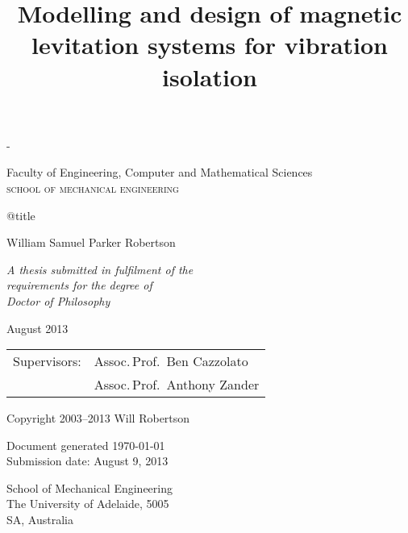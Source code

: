 \documentclass[11pt,a4paper]{memoir}
\title{
Modelling and design of magnetic levitation systems for vibration isolation
}
\begin{document}
\pagestyle{empty}
\label{titlepage}
\calccentering{\unitlength}
\begin{adjustwidth*}{\unitlength}{-\unitlength}
\setlength{\parindent}{0pt}

\begin{flushright}
  \hspace*{-1cm}
\end{flushright}

\vfill

Faculty of Engineering,
Computer and Mathematical Sciences\\
\textsc{school of mechanical engineering}

\vfill

\begin{minipage}{0.97\textwidth}
\Large\raggedright\csname @title\endcsname
\end{minipage}

\vspace{10mm}

William Samuel Parker Robertson

\vfill
\vfill

\begin{minipage}{0.50\textwidth}
\raggedright
\itshape
A thesis submitted in fulfilment of the\\ requirements for the degree of\\
Doctor of Philosophy

\bigskip
August 2013
\end{minipage}
\vfill

\end{adjustwidth*}

\clearpage

\null\vfill

\begin{center}

\itshape

  \begin{tabular}{@{}l@{~~}l@{}}
  Supervisors:    & Assoc.\,Prof.\ Ben Cazzolato  \\
                  & Assoc.\,Prof.\ Anthony Zander
  \end{tabular}
  
  \bigskip
  
  Copyright %
  2003--2013 Will Robertson

  \bigskip
  Document generated \today\\
  Submission date: August 9, 2013


  \bigskip
  School of Mechanical Engineering\\
  The University of Adelaide, 5005\\
  SA, Australia
\end{center}
\end{document}
